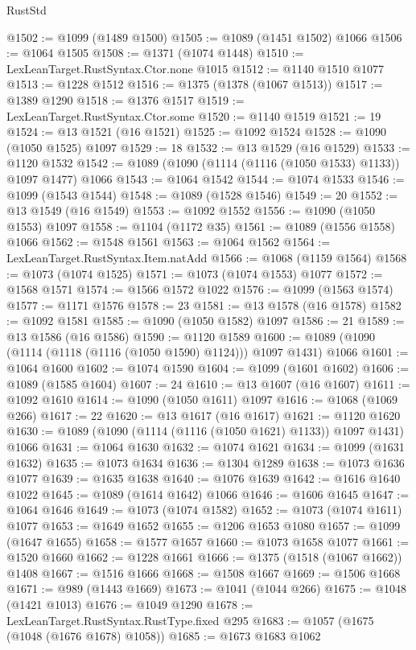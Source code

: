 \begin{lexlean}{RustStd}
\begin{coremodule}
@1502 := @1099 (@1489 @1500)
@1505 := @1089 (@1451 @1502) @1066
@1506 := @1064 @1505
@1508 := @1371 (@1074 @1448)
@1510 := LexLeanTarget.RustSyntax.Ctor.none @1015
@1512 := @1140 @1510 @1077
@1513 := @1228 @1512
@1516 := @1375 (@1378 (@1067 @1513))
@1517 := @1389 @1290
@1518 := @1376 @1517
@1519 := LexLeanTarget.RustSyntax.Ctor.some
@1520 := @1140 @1519
@1521 := 19
@1524 := @13 @1521 (@16 @1521)
@1525 := @1092 @1524
@1528 := @1090 (@1050 @1525) @1097
@1529 := 18
@1532 := @13 @1529 (@16 @1529)
@1533 := @1120 @1532
@1542 := @1089 (@1090 (@1114 (@1116 (@1050 @1533) @1133)) @1097 @1477) @1066
@1543 := @1064 @1542
@1544 := @1074 @1533
@1546 := @1099 (@1543 @1544)
@1548 := @1089 (@1528 @1546)
@1549 := 20
@1552 := @13 @1549 (@16 @1549)
@1553 := @1092 @1552
@1556 := @1090 (@1050 @1553) @1097
@1558 := @1104 (@1172 @35)
@1561 := @1089 (@1556 @1558) @1066
@1562 := @1548 @1561
@1563 := @1064 @1562
@1564 := LexLeanTarget.RustSyntax.Item.natAdd
@1566 := @1068 (@1159 @1564)
@1568 := @1073 (@1074 @1525)
@1571 := @1073 (@1074 @1553) @1077
@1572 := @1568 @1571
@1574 := @1566 @1572 @1022
@1576 := @1099 (@1563 @1574)
@1577 := @1171 @1576
@1578 := 23
@1581 := @13 @1578 (@16 @1578)
@1582 := @1092 @1581
@1585 := @1090 (@1050 @1582) @1097
@1586 := 21
@1589 := @13 @1586 (@16 @1586)
@1590 := @1120 @1589
@1600 := @1089 (@1090 (@1114 (@1118 (@1116 (@1050 @1590) @1124))) @1097 @1431) @1066
@1601 := @1064 @1600
@1602 := @1074 @1590
@1604 := @1099 (@1601 @1602)
@1606 := @1089 (@1585 @1604)
@1607 := 24
@1610 := @13 @1607 (@16 @1607)
@1611 := @1092 @1610
@1614 := @1090 (@1050 @1611) @1097
@1616 := @1068 (@1069 @266)
@1617 := 22
@1620 := @13 @1617 (@16 @1617)
@1621 := @1120 @1620
@1630 := @1089 (@1090 (@1114 (@1116 (@1050 @1621) @1133)) @1097 @1431) @1066
@1631 := @1064 @1630
@1632 := @1074 @1621
@1634 := @1099 (@1631 @1632)
@1635 := @1073 @1634
@1636 := @1304 @1289
@1638 := @1073 @1636 @1077
@1639 := @1635 @1638
@1640 := @1076 @1639
@1642 := @1616 @1640 @1022
@1645 := @1089 (@1614 @1642) @1066
@1646 := @1606 @1645
@1647 := @1064 @1646
@1649 := @1073 (@1074 @1582)
@1652 := @1073 (@1074 @1611) @1077
@1653 := @1649 @1652
@1655 := @1206 @1653 @1080
@1657 := @1099 (@1647 @1655)
@1658 := @1577 @1657
@1660 := @1073 @1658 @1077
@1661 := @1520 @1660
@1662 := @1228 @1661
@1666 := @1375 (@1518 (@1067 @1662)) @1408
@1667 := @1516 @1666
@1668 := @1508 @1667
@1669 := @1506 @1668
@1671 := @989 (@1443 @1669)
@1673 := @1041 (@1044 @266)
@1675 := @1048 (@1421 @1013)
@1676 := @1049 @1290
@1678 := LexLeanTarget.RustSyntax.RustType.fixed @295
@1683 := @1057 (@1675 (@1048 (@1676 @1678) @1058))
@1685 := @1673 @1683 @1062

\end{coremodule}
\end{lexlean}
